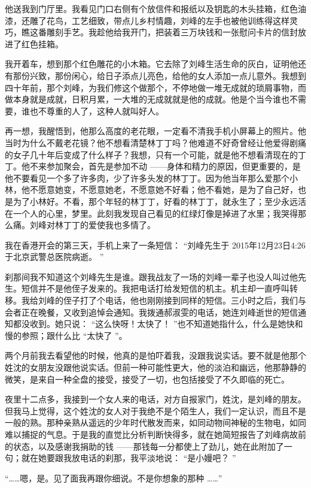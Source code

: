 \documentclass[12pt,twoside,openany]{book}
\begin{document}
他送我到门厅里。我看见门口右侧有个放信件和报纸以及钥匙的木头挂箱，红色油漆，还雕了花鸟，工艺细致，带点儿乡村情趣，刘峰的左手也被他训练得这样灵巧，瞧这番雕刻手艺。我趁他给我开门，把装着三万块钱和一张慰问卡片的信封放进了红色挂箱。

我开着车，想到那个红色雕花的小木箱。它去除了刘峰生活生命的灰白，证明他还有那份兴致，那份闲心，给日子添点儿亮色，给他的女人添加一点儿意外。我想到四十年前，那个刘峰，为我们修这个做那个，不停地做一堆无成就的琐屑事物，而做本身就是成就，日积月累，一大堆的无成就就是他的成就。他是个当今谁也不需要，谁也不尊重的人了，这种人就叫好人。

再一想，我醒悟到，他那么高度的老花眼，一定看不清我手机小屏幕上的照片。他当时为什么不戴老花镜？他不想看清楚林丁丁吗？他难道不好奇曾经让他爱得剧痛的女子几十年后变成了什么样子？我想，只有一个可能，就是他不想看清现在的丁丁。他不来参加聚会，首先是参加不动 ——身体和精力的原因，但更重要的，是他不要看见一个多了许多肉，少了许多头发的林丁丁。因为他当年那么爱那个小林，他不愿意她变，不愿意她老，不愿意她不好看；他不看她，是为了自己好，也是为了小林好。不看，那个年轻的林丁丁，好看的林丁丁，就永生了；至少永远活在一个人的心里，梦里。此刻我发现自己看见的红绿灯像是掉进了水里；我哭得那么痛。刘峰对林丁丁的爱使我也多情了。

我在香港开会的第三天，手机上来了一条短信： “刘峰先生于 2015年12月23日4:26于北京武警总医院病逝。 ”

刹那间我不知道这个刘峰先生是谁。跟我战友了一场的刘峰一辈子也没人叫过他先生。短信并不是他侄子发来的。我把电话打给发短信的机主。机主却一直呼叫转移。我给刘峰的侄子打了个电话，他也刚刚接到同样的短信。三小时之后，我们与会者正在晚餐，又收到追悼会通知。我拨通郝淑雯的电话，她连刘峰逝世的短信通知都没收到。她只说： “这么快呀！太快了！ ”也不知道她指什么，什么是她快和慢的参照；跟什么比 “太快了 ”。

两个月前我去看望他的时候，他真的是怕吓着我，没跟我说实话。要不就是他那个姓沈的女朋友没跟他说实话。但前一种可能性更大，他的淡泊和幽远，他那静静的微笑，是来自一种全盘的接受，接受了一切，也包括接受了不久即临的死亡。

夜里十二点多，我接到一个女人来的电话，对方自报家门，姓沈，是刘峰的朋友。但我马上觉得，这个姓沈的女人对于我绝不是个陌生人，我们一定认识，而且不是一般的熟。那种亲熟从遥远的少年时代散发而来，如同动物间神秘的生物电，如同难以捕捉的气息。于是我的直觉比分析判断快得多，就在她简短报告了刘峰病故前的状态，以及感谢我捐助的钱 ——那钱每一分都使上了劲儿，她在此附加了一句；就在她要跟我放电话的刹那，我平淡地说： “是小嫚吧？ ”

“……嗯，是。见了面我再跟你细说。不是你想象的那种 ……”
\end{document}

